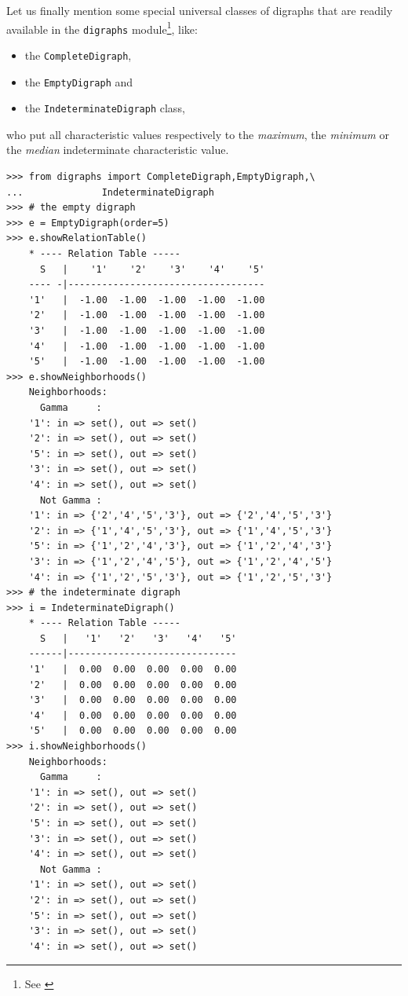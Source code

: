 Let us finally mention some special universal classes of digraphs that are readily available in the \texttt{digraphs} module\footnote{See \citealp{BIS-2021}}, like:
\begin{itemize}[nosep]
\item the \texttt{CompleteDigraph},
\item  the \texttt{EmptyDigraph} and
\item  the \texttt{IndeterminateDigraph} class,
\end{itemize}
who put all characteristic values respectively to the \emph{maximum}, the \emph{minimum} or the \emph{median} indeterminate characteristic value.
\begin{lstlisting}[caption={Complete, empty and indeterminate digraphs},label=list:2.11]
>>> from digraphs import CompleteDigraph,EmptyDigraph,\
...   			 IndeterminateDigraph
>>> # the empty digraph   
>>> e = EmptyDigraph(order=5)
>>> e.showRelationTable()
    * ---- Relation Table -----
      S   |    '1'    '2'    '3'    '4'	   '5'	  
    ---- -|-----------------------------------
    '1'   |  -1.00  -1.00  -1.00  -1.00	 -1.00	 
    '2'   |  -1.00  -1.00  -1.00  -1.00	 -1.00	 
    '3'   |  -1.00  -1.00  -1.00  -1.00	 -1.00	 
    '4'   |  -1.00  -1.00  -1.00  -1.00	 -1.00	 
    '5'   |  -1.00  -1.00  -1.00  -1.00	 -1.00
>>> e.showNeighborhoods() 
    Neighborhoods:
      Gamma     :
    '1': in => set(), out => set()
    '2': in => set(), out => set()
    '5': in => set(), out => set()
    '3': in => set(), out => set()
    '4': in => set(), out => set()
      Not Gamma :
    '1': in => {'2','4','5','3'}, out => {'2','4','5','3'}
    '2': in => {'1','4','5','3'}, out => {'1','4','5','3'}
    '5': in => {'1','2','4','3'}, out => {'1','2','4','3'}
    '3': in => {'1','2','4','5'}, out => {'1','2','4','5'}
    '4': in => {'1','2','5','3'}, out => {'1','2','5','3'}
>>> # the indeterminate digraph
>>> i = IndeterminateDigraph()
    * ---- Relation Table -----
      S   |   '1'   '2'	  '3'	'4'   '5'	  
    ------|------------------------------
    '1'   |  0.00  0.00	 0.00  0.00  0.00	 
    '2'   |  0.00  0.00	 0.00  0.00  0.00	 
    '3'   |  0.00  0.00	 0.00  0.00  0.00	 
    '4'   |  0.00  0.00	 0.00  0.00  0.00	 
    '5'   |  0.00  0.00	 0.00  0.00  0.00	 
>>> i.showNeighborhoods()
    Neighborhoods:
      Gamma     :
    '1': in => set(), out => set()
    '2': in => set(), out => set()
    '5': in => set(), out => set()
    '3': in => set(), out => set()
    '4': in => set(), out => set()
      Not Gamma :
    '1': in => set(), out => set()
    '2': in => set(), out => set()
    '5': in => set(), out => set()
    '3': in => set(), out => set()
    '4': in => set(), out => set()
\end{lstlisting}
